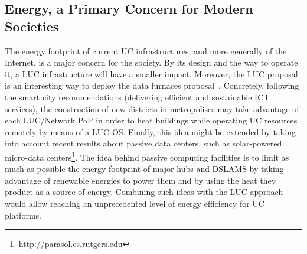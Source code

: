 \subsection{Energy, a Primary Concern for Modern Societies}

The energy footprint of current UC infrastructures, and more generally of the
Internet, is a major concern for the society.  By its design and the way
to operate it, a LUC infrastructure will have a smaller impact.
 Moreover, the LUC proposal is an interesting way to
deploy the data furnaces proposal~\cite{liu:hotcloud11}.  Concretely, following
the smart city recommendations (\ie delivering efficient and
sustainable ICT services), the construction of new districts in metropolises
may take advantage of each LUC/Network PoP in order to heat buildings while
operating UC resources remotely by means of a LUC OS. Finally, this idea might
be extended by taking into account recent results about passive data centers,
such as solar-powered
micro-data centers\footnote{\href{http://parasol.cs.rutgers.edu}{\url{http://parasol.cs.rutgers.edu}}}.
The idea behind passive computing facilities is to limit as much as possible
the energy footprint of major hubs and DSLAMS by taking advantage of renewable
energies to power them and by using the heat they product as a source of
energy. Combining such ideas with the LUC approach would allow reaching an
unprecedented level of energy efficiency for UC platforms.

